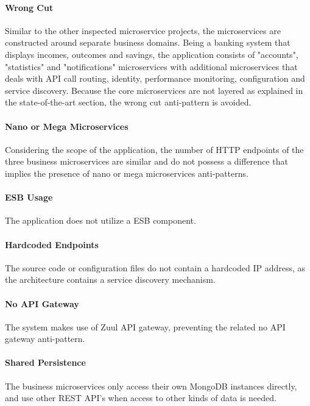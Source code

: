 \documentclass{Configuration_Files/PoliMi3i_thesis}
\begin{document}
    \paragraph{Wrong Cut} Similar to the other inspected microservice projects, the microservices are constructed around separate business domains.
    Being a banking system that displays incomes, outcomes and savings, the application consists of "accounts", "statistics" and "notifications" microservices with additional microservices that deals with API call routing, identity, performance monitoring, configuration and service discovery.
    Because the core microservices are not layered as explained in the state-of-the-art section, the wrong cut anti-pattern is avoided.
    
    \paragraph{Nano or Mega Microservices} Considering the scope of the application, the number of HTTP endpoints of the three business microservices are similar and do not possess a difference that implies the presence of nano or mega microservices anti-patterns.
    
    \paragraph{ESB Usage} The application does not utilize a ESB component.
    
    \paragraph{Hardcoded Endpoints} The source code or configuration files do not contain a hardcoded IP address, as the architecture contains a service discovery mechanism.
    
    \paragraph{No API Gateway} The system makes use of Zuul API gateway, preventing the related no API gateway anti-pattern.
    
    \paragraph{Shared Persistence} The business microservices only access their own MongoDB instances directly, and use other REST API's when access to other kinds of data is needed.
    
\end{document}
